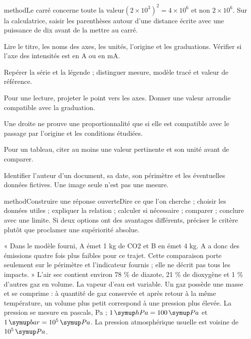 \begin{pcEncadre}{method}{Le carré concerne toute la valeur}$(2\times10^3)^2=4\times10^6$ et non $2\times10^6$. Sur la calculatrice, saisir les parenthèses autour d’une distance écrite avec une puissance de dix avant de la mettre au carré.\end{pcEncadre}
\label{graphiques}
\begin{questions}
\item Lire le titre, les noms des axes, les unités, l’origine et les graduations. Vérifier si l’axe des intensités est en A ou en mA.
\item Repérer la série et la légende ; distinguer mesure, modèle tracé et valeur de référence.
\item Pour une lecture, projeter le point vers les axes. Donner une valeur arrondie compatible avec la graduation.
\item Une droite ne prouve une proportionnalité que si elle est compatible avec le passage par l’origine et les conditions étudiées.
\item Pour un tableau, citer au moins une valeur pertinente et son unité avant de comparer.
\item Identifier l’auteur d’un document, sa date, son périmètre et les éventuelles données fictives. Une image seule n’est pas une mesure.
\end{questions}
\begin{pcEncadre}{method}{Construire une réponse ouverte}Dire ce que l’on cherche ; choisir les données utiles ; expliquer la relation ; calculer si nécessaire ; comparer ; conclure avec une limite. Si deux options ont des avantages différents, préciser le critère plutôt que proclamer une supériorité absolue.\end{pcEncadre}
« Dans le modèle fourni, A émet 1 kg de CO2 et B en émet 4 kg. A a donc des émissions quatre fois plus faibles pour ce trajet. Cette comparaison porte seulement sur le périmètre et l’indicateur fournis ; elle ne décrit pas tous les impacts. »
\label{air}
L’air sec contient environ 78 \% de diazote, 21 \% de dioxygène et 1 \% d’autres gaz en volume. La vapeur d’eau est variable. Un gaz possède une masse et se comprime : à quantité de gaz conservée et après retour à la même température, un volume plus petit correspond à une pression plus élevée. La pression se mesure en pascals, Pa ; $1\unite{hPa}=100\unite{Pa}$ et $1\unite{bar}=10^5\unite{Pa}$. La pression atmosphérique usuelle est voisine de $10^5\unite{Pa}$.
